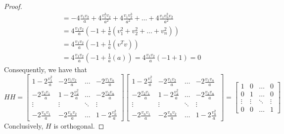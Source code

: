 \documentclass[12pt]{article}
\begin{document}
\begin{proof}
\begin{align*}
				&=-4\frac{v_1v_2}{a} +4\frac{v_1^3v_2}{a^2} +4\frac{v_1v_2^3}{a^2}+\dots+4\frac{v_1v_n^2v_2}{a^2}\\
				&=4\frac{v_1v_2}{a} \left( -1 +\frac{1}{a}(v_1^2+v_2^2+\dots+v_n^2) \right)\\
				&=4\frac{v_1v_2}{a} \left( -1 +\frac{1}{a}(v^Tv) \right) \\
				&=4\frac{v_1v_2}{a} \left( -1 +\frac{1}{a}(a) \right) =4\frac{v_1v_2}{a} \left( -1 + 1 \right) = 0
			\end{align*}
		Consequently, we have that \[ HH= \begin{bmatrix}
		1-2\frac{v_1^2}{a} & -2\frac{v_1v_2}{a} & \dots & -2\frac{v_1v_n}{a}\\
		-2\frac{v_2v_1}{a} & 1-2\frac{v_2^2}{a} & \dots & -2\frac{v_2v_n}{a} \\
		\vdots & \vdots & \ddots & \vdots \\
		-2\frac{v_nv_1}{a} & -2\frac{v_nv_2}{a} & \dots & 1-2\frac{v_n^2}{a}
		\end{bmatrix} \begin{bmatrix}
		1-2\frac{v_1^2}{a} & -2\frac{v_1v_2}{a} & \dots & -2\frac{v_1v_n}{a}\\
		-2\frac{v_2v_1}{a} & 1-2\frac{v_2^2}{a} & \dots & -2\frac{v_2v_n}{a} \\
		\vdots & \vdots & \ddots & \vdots \\
		-2\frac{v_nv_1}{a} & -2\frac{v_nv_2}{a} & \dots & 1-2\frac{v_n^2}{a}
		\end{bmatrix} = \begin{bmatrix}
		1 & 0 & \dots & 0 \\
		0 & 1 & \dots & 0 \\
		\vdots & \vdots & \ddots & \vdots \\
		0 & 0 & \dots &1
		\end{bmatrix} \]
		Conclusively, $ H $ is orthogonal.
		\end{proof}
\end{document}
